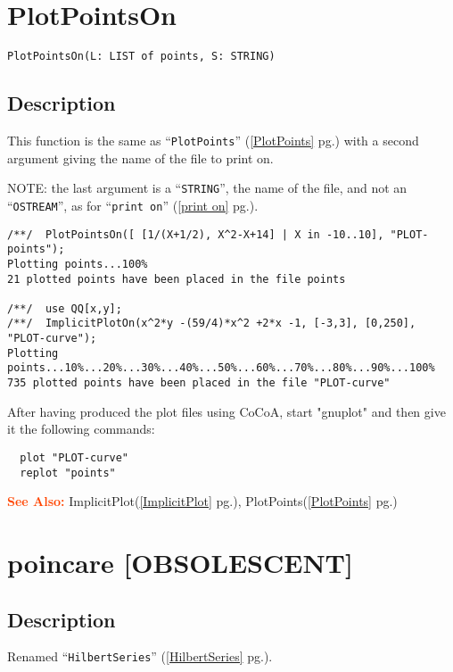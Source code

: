 \documentclass[a4paper]{mybook}
\newenvironment{command}{}{} %
\newcommand\SeeAlso{\par\textcolor{OrangeRed}{\textbf{\large See Also: }}}
\begin{document}
\section{PlotPointsOn}
\label{PlotPointsOn}
\begin{command} %


\begin{Verbatim}[label=syntax, rulecolor=\color{MidnightBlue},
frame=single]
PlotPointsOn(L: LIST of points, S: STRING)
\end{Verbatim}


\subsection*{Description}

This function is the same as ``\verb&PlotPoints&'' (\ref{PlotPoints} pg.\pageref{PlotPoints}) with a second
argument giving the name of the file to print on.
\par 
NOTE: the last argument is a ``\verb&STRING&'', the name of the file, and not
an ``\verb&OSTREAM&'', as for ``\verb&print on&'' (\ref{print on} pg.\pageref{print on}).
\begin{Verbatim}[label=example, rulecolor=\color{PineGreen}, frame=single]
/**/  PlotPointsOn([ [1/(X+1/2), X^2-X+14] | X in -10..10], "PLOT-points");
Plotting points...100%
21 plotted points have been placed in the file points

/**/  use QQ[x,y];
/**/  ImplicitPlotOn(x^2*y -(59/4)*x^2 +2*x -1, [-3,3], [0,250], "PLOT-curve");
Plotting points...10%...20%...30%...40%...50%...60%...70%...80%...90%...100%
735 plotted points have been placed in the file "PLOT-curve"
\end{Verbatim}

After having produced the plot files using CoCoA,
start "gnuplot" and then give it the following commands:
\begin{verbatim}  plot "PLOT-curve"
  replot "points"
\end{verbatim}

\SeeAlso %
  ImplicitPlot(\ref{ImplicitPlot} pg.\pageref{ImplicitPlot}), 
    PlotPoints(\ref{PlotPoints} pg.\pageref{PlotPoints})
\end{command} %

\section{poincare [OBSOLESCENT]}
\label{poincare [OBSOLESCENT]}
\begin{command} %



\subsection*{Description}

Renamed ``\verb&HilbertSeries&'' (\ref{HilbertSeries} pg.\pageref{HilbertSeries}).

\end{command} %
\end{document}
